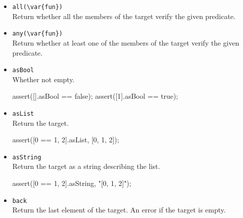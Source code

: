 \begin{itemize}
\item \lstinline|all(\var{fun})|\\
Return whether all the members of the target verify the given
predicate.


\item \lstinline|any(\var{fun})|\\
Return whether at least one of the members of the target verify the
given predicate.


\item \lstinline|asBool|\\
  Whether not empty.
\begin{urbiscript}[firstnumber=last]
assert([].asBool == false);
assert([1].asBool == true);
\end{urbiscript}

\item \lstinline|asList|\\
Return the target.

\begin{urbiscript}[firstnumber=last]
assert([0 == 1, 2].asList, [0, 1, 2]);
\end{urbiscript}

\item \lstinline|asString|\\
Return the target as a string describing the list.

\begin{urbiscript}[firstnumber=last]
assert([0 == 1, 2].asString, "[0, 1, 2]");
\end{urbiscript}

\item \lstinline|back|\\
Return the last element of the target. An error if the target is empty.


\end{itemize}
